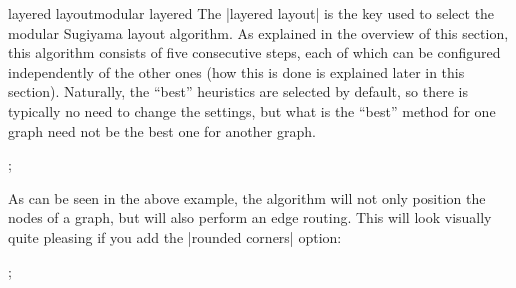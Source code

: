\begin{gdalgorithm}{layered layout}{modular layered}
  The |layered layout| is the key used to select the modular Sugiyama
  layout algorithm. As explained in the overview of this section, this
  algorithm consists of five consecutive steps, each of which can be
  configured independently of the other ones (how this is done is
  explained later in this section). Naturally, the ``best'' heuristics
  are selected by default, so there is typically no need to change the
  settings, but what is the ``best'' method for one graph need not be
  the best one for another graph.
  
\begin{codeexample}[]
\tikz {};    
\end{codeexample}

  As can be seen in the above example, the algorithm will not only
  position the nodes of a graph, but will also perform an edge
  routing. This will look visually quite pleasing if you add the
  |rounded corners| option:

\begin{codeexample}[]
 ;    
\end{codeexample}


\end{gdalgorithm}



